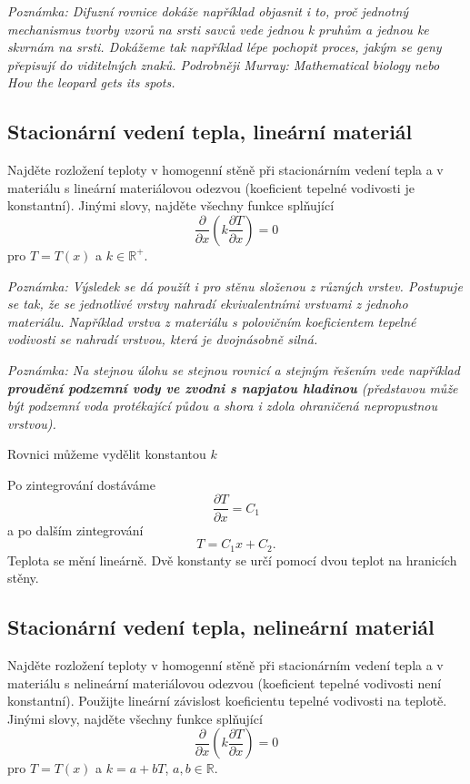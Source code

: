 \textit{Poznámka: Difuzní rovnice dokáže například objasnit i to, proč jednotný mechanismus tvorby vzorů na srsti savců vede jednou k pruhům a jednou ke skvrnám na srsti. Dokážeme tak například lépe pochopit proces, jakým se geny přepisují do viditelných znaků. Podrobněji Murray: Mathematical biology nebo How the leopard gets its spots.}

\stranka
\subsection{Stacionární vedení tepla, lineární materiál}

Najděte rozložení teploty v homogenní stěně při stacionárním vedení tepla a v materiálu s lineární materiálovou odezvou (koeficient tepelné vodivosti je konstantní).
Jinými slovy, najděte všechny funkce splňující
$$\frac{\partial}{\partial x} \left(k \frac{\partial T}{\partial x}\right)=0$$
pro $T=T(x)$ a $k\in \mathbb R^+$.

\textit{Poznámka: Výsledek se dá použít i pro stěnu složenou z různých vrstev. Postupuje se tak, že se jednotlivé vrstvy nahradí ekvivalentními vrstvami z jednoho materiálu. Například vrstva z materiálu s polovičním koeficientem tepelné vodivosti se nahradí vrstvou, která je dvojnásobně silná.}

\textit{Poznámka: Na stejnou úlohu se stejnou rovnicí a stejným řešením vede například {\bfseries proudění podzemní vody ve zvodni s napjatou hladinou} (představou může být podzemní voda protékající půdou a shora i zdola ohraničená nepropustnou vrstvou).}

\reseni

Rovnici můžeme vydělit konstantou $k$

Po zintegrování dostáváme $$ \frac{\partial T}{\partial x}=C_1$$
a po dalším zintegrování $$T=C_1x+C_2.$$ Teplota se mění lineárně. Dvě konstanty se určí pomocí dvou teplot na hranicích stěny.

\konec

\stranka
\subsection{Stacionární vedení tepla, nelineární materiál}


Najděte rozložení teploty v homogenní stěně při stacionárním vedení
tepla a v materiálu s nelineární materiálovou odezvou (koeficient
tepelné vodivosti není konstantní).  Použijte lineární závislost
koeficientu tepelné vodivosti na teplotě.  Jinými slovy, najděte
všechny funkce splňující
$$\frac{\partial}{\partial x} \left(k \frac{\partial T}{\partial x}\right)=0$$
pro $T=T(x)$ a $k=a+bT$, $a,b\in \mathbb R$.

